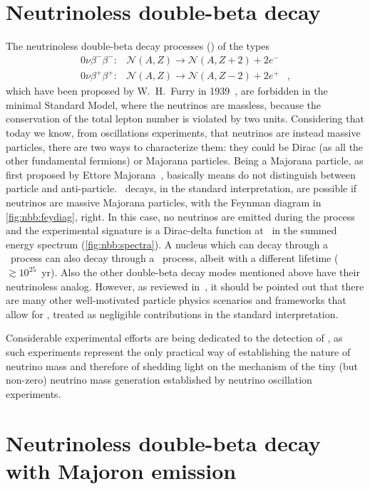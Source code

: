 \section{Neutrinoless double-beta decay}\label{sec:nbb:0nbb}

The neutrinoless double-beta decay processes (\onbb) of the types
\[
  \begin{array}{lrl}
    0\nu\beta^-\beta^-: &
      \mathcal{N}(A,Z) \longrightarrow \mathcal{N}(A,Z+2)+2e^- & \\
    0\nu\beta^+\beta^+: &
      \mathcal{N}(A,Z) \longrightarrow \mathcal{N}(A,Z-2)+2e^+ &,
  \end{array}
\]
which have been proposed by W.~H.~Furry in 1939~\cite{Furry1939}, are
forbidden in the minimal Standard Model, where the neutrinos are massless,
because the conservation of the total lepton number is violated by two units.
Considering that today we know, from oscillations experiments, that neutrinos
are instead massive particles, there are two ways to characterize them: they
could be Dirac (as all the other fundamental fermions) or Majorana particles.
Being a Majorana particle, as first proposed by Ettore
Majorana~\cite{Majorana1932}, basically means do not distinguish between
particle and anti-particle. \onbb\ decays, in the standard interpretation, are
possible if neutrinos are massive Majorana particles, with the Feynman diagram
in \cref{fig:nbb:feydiag}, right. In this case, no neutrinos are emitted during
the process and the experimental signature is a Dirac-delta function at \qbb\
in the summed energy spectrum (\cref{fig:nbb:spectra}).  A nucleus which can
decay through a \nnbb\ process can also decay through a \onbb\ process, albeit
with a different lifetime ($\gtrsim 10^{25}$~yr). Also the other double-beta
decay modes mentioned above have their neutrinoless analog. However, as
reviewed in~\cite{Rodejohann2011}, it should be pointed out that there are many
other well-motivated particle physics scenarios and frameworks that allow for
\onbb, treated as negligible contributions in the standard interpretation.

Considerable experimental efforts are being dedicated to the detection of
\onbb, as such experiments represent the only practical way of establishing
the nature of neutrino mass and therefore of shedding light on the mechanism of
the tiny (but non-zero) neutrino mass generation established by neutrino
oscillation experiments.

\section{Neutrinoless double-beta decay with Majoron emission}

